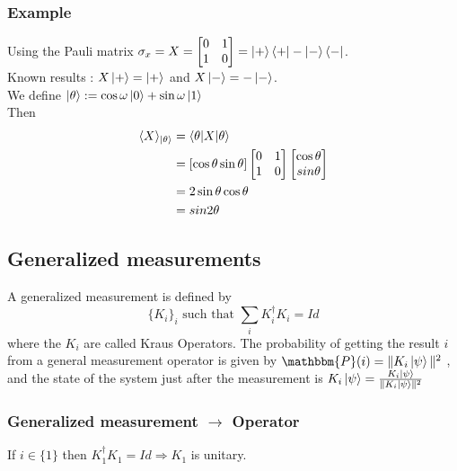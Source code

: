 \documentclass{article}
\begin{document}
\subsubsection*{Example}
Using the Pauli matrix $\sigma_x = X =
    \begin{bmatrix}
    0 & 1 \\
    1 & 0
    \end{bmatrix}
    = \ket{+}\bra{+} - \ket{-}\bra{-}
    $.
\\\noindent
Known results : $X\ket{+} = \ket{+}$ and $X\ket{-}=-\ket{-}$.
\\\noindent
We define $\ket{\theta}:=\cos\omega\ket{0}+\sin\omega\ket{1}$
\\\noindent
Then
\begin{equation}
    \begin{aligned}
        \langle X \rangle_{\ket{\theta}}
            & = \braket{\theta | X |\theta} \\
            & = [\cos \theta \sin \theta]
                \begin{bmatrix}0 & 1 \\ 1 & 0 \end{bmatrix}
                \begin{bmatrix} \cos \theta\\ sin \theta \end{bmatrix} \\
            & = 2 \sin\theta\cos\theta \\
            & = sin 2\theta
    \end{aligned}
\end{equation}


\subsection{Generalized measurements}
A generalized measurement is defined by
\begin{equation}
    \{K_i\}_i \text{ such that } \sum_i K_i^\dagger K_i=Id
\end{equation}
where the $K_i$ are called Kraus Operators.
The probability of getting the result $i$ from a general measurement operator is given by
$\mathbbm{P}(i) = \|K_i\ket{\psi}\|^2$
, and the state of the system just after the measurement is $K_i\ket{\psi}=\frac{K_i\ket{\psi}}{\|K_i\ket{\psi}\|^2}$

\subsubsection*{Generalized measurement $\rightarrow$ Operator}
If $i \in \{1\}$ then
$K_1^\dagger K_1=Id \Rightarrow K_1$ is unitary.%
\end{document}
